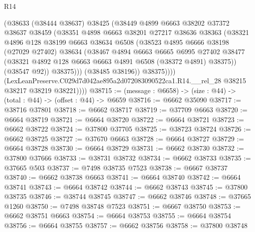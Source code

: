 \begin{lexlean}{R14}
\begin{coremodule}
                  (@38633
                    (@38444 @38637)
                    @38425
                    (@38449
                      @4899
                      @6663
                      @38202
                      @37372
                      @38637
                      @38459
                      (@38351
                        @4898
                        @6663
                        @38201
                        @27217
                        @38636
                        @38363
                        (@38321
                          @4896
                          @128
                          @38199
                          @6663
                          @38634
                          @6508
                          (@38523
                            @4895
                            @6666
                            @38198
                            (@27029 @27402)
                            @38634
                            (@38467
                              @4894
                              @6663
                              @6665
                              @6995
                              @27402
                              @38477
                              (@38321 @4892 @128 @6663 @6663 @4891 @6508 (@38372 @4891) @38375))
                            (@38547 @92))
                          @38375)))
                    (@38485 @38196))
                  @38375))))
          (LexLeanPreserve.C029d7d042ae895a2d072083090522ca1.R14.__rel_28
            @38215
            @38217
            @38219
            @38221))))
@38715 := (message : @6658) -> (size : @44) -> (total : @44) -> (offset : @44) -> @6659
@38716 := @6662 @35090
@38717 := @38716 @37801
@38718 := @6662 @38717
@38719 := @37709 @6663
@38720 := @6664 @38719
@38721 := @6664 @38720
@38722 := @6664 @38721
@38723 := @6662 @38722
@38724 := @37800 @37705
@38725 := @38723 @38724
@38726 := @6662 @38725
@38727 := @37670 @6663
@38728 := @6664 @38727
@38729 := @6664 @38728
@38730 := @6664 @38729
@38731 := @6662 @38730
@38732 := @37800 @37666
@38733 := @38731 @38732
@38734 := @6662 @38733
@38735 := @37665 @503
@38737 := @7498 @38735 @7523
@38738 := @6667 @38737
@38740 := @6662 @38738 @6663
@38741 := @6664 @38740
@38742 := @6664 @38741
@38743 := @6664 @38742
@38744 := @6662 @38743
@38745 := @37800 @38735
@38746 := @38744 @38745
@38747 := @6662 @38746
@38748 := @37665 @1260
@38750 := @7498 @38748 @7523
@38751 := @6667 @38750
@38753 := @6662 @38751 @6663
@38754 := @6664 @38753
@38755 := @6664 @38754
@38756 := @6664 @38755
@38757 := @6662 @38756
@38758 := @37800 @38748

\end{coremodule}
\end{lexlean}
